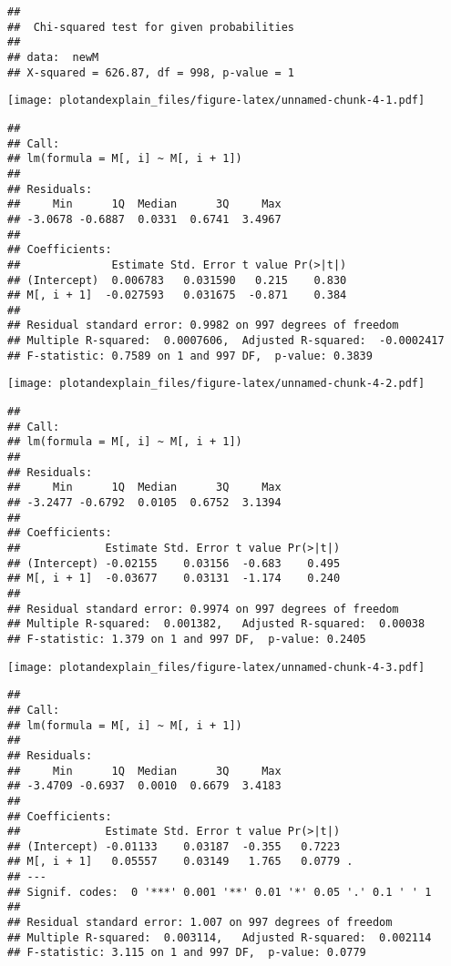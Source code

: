 \documentclass[]{article}
\begin{document}
\begin{verbatim}
## 
##  Chi-squared test for given probabilities
## 
## data:  newM
## X-squared = 626.87, df = 998, p-value = 1
\end{verbatim}

\texttt{[image: plotandexplain\_files/figure-latex/unnamed-chunk-4-1.pdf]}

\begin{verbatim}
## 
## Call:
## lm(formula = M[, i] ~ M[, i + 1])
## 
## Residuals:
##     Min      1Q  Median      3Q     Max 
## -3.0678 -0.6887  0.0331  0.6741  3.4967 
## 
## Coefficients:
##              Estimate Std. Error t value Pr(>|t|)
## (Intercept)  0.006783   0.031590   0.215    0.830
## M[, i + 1]  -0.027593   0.031675  -0.871    0.384
## 
## Residual standard error: 0.9982 on 997 degrees of freedom
## Multiple R-squared:  0.0007606,  Adjusted R-squared:  -0.0002417 
## F-statistic: 0.7589 on 1 and 997 DF,  p-value: 0.3839
\end{verbatim}

\texttt{[image: plotandexplain\_files/figure-latex/unnamed-chunk-4-2.pdf]}

\begin{verbatim}
## 
## Call:
## lm(formula = M[, i] ~ M[, i + 1])
## 
## Residuals:
##     Min      1Q  Median      3Q     Max 
## -3.2477 -0.6792  0.0105  0.6752  3.1394 
## 
## Coefficients:
##             Estimate Std. Error t value Pr(>|t|)
## (Intercept) -0.02155    0.03156  -0.683    0.495
## M[, i + 1]  -0.03677    0.03131  -1.174    0.240
## 
## Residual standard error: 0.9974 on 997 degrees of freedom
## Multiple R-squared:  0.001382,   Adjusted R-squared:  0.00038 
## F-statistic: 1.379 on 1 and 997 DF,  p-value: 0.2405
\end{verbatim}

\texttt{[image: plotandexplain\_files/figure-latex/unnamed-chunk-4-3.pdf]}

\begin{verbatim}
## 
## Call:
## lm(formula = M[, i] ~ M[, i + 1])
## 
## Residuals:
##     Min      1Q  Median      3Q     Max 
## -3.4709 -0.6937  0.0010  0.6679  3.4183 
## 
## Coefficients:
##             Estimate Std. Error t value Pr(>|t|)  
## (Intercept) -0.01133    0.03187  -0.355   0.7223  
## M[, i + 1]   0.05557    0.03149   1.765   0.0779 .
## ---
## Signif. codes:  0 '***' 0.001 '**' 0.01 '*' 0.05 '.' 0.1 ' ' 1
## 
## Residual standard error: 1.007 on 997 degrees of freedom
## Multiple R-squared:  0.003114,   Adjusted R-squared:  0.002114 
## F-statistic: 3.115 on 1 and 997 DF,  p-value: 0.0779
\end{verbatim}
\end{document}
